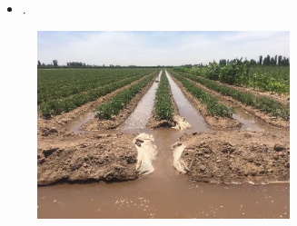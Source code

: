 \begin{frame}
	\frametitle{\secname}
	\begin{minipage}{0.5\textwidth}
		\begin{itemize}
			\item .
		\end{itemize}
	\end{minipage}
	\begin{minipage}{0.47\textwidth}
		\begin{figure}[ht!]
			\centering
			\includegraphics[height=5.5cm]{water_waster2}
		\end{figure}
	\end{minipage}
\end{frame}

